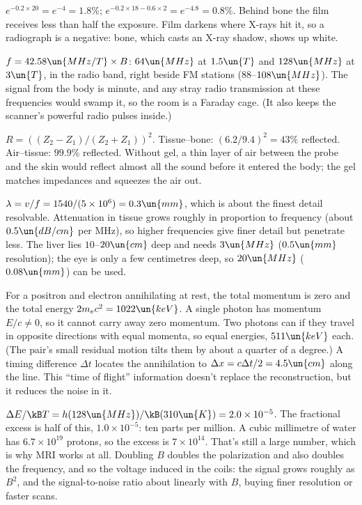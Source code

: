 
 $e^{-0.2\times20} = e^{-4} = 1.8\%$; $e^{-0.2\times18 - 0.6\times2} = e^{-4.8} = 0.8\%$. Behind bone the film receives less than half the exposure. Film darkens where X-rays hit it, so a radiograph is a negative: bone, which casts an X-ray shadow, shows up white.

 $f = 42.58\un{MHz/T}\times B$: $64\un{MHz}$ at $1.5\un{T}$ and $128\un{MHz}$ at $3\un{T}$, in the radio band, right beside FM stations ($88$--$108\un{MHz}$). The signal from the body is minute, and any stray radio transmission at these frequencies would swamp it, so the room is a Faraday cage. (It also keeps the scanner's powerful radio pulses inside.)

 $R = ((Z_2-Z_1)/(Z_2+Z_1))^2$. Tissue--bone: $(6.2/9.4)^2 = 43\%$ reflected. Air--tissue: $99.9\%$ reflected. Without gel, a thin layer of air between the probe and the skin would reflect almost all the sound before it entered the body; the gel matches impedances and squeezes the air out.

 $\lambda = v/f = 1540/(5\times10^6) = 0.3\un{mm}$, which is about the finest detail resolvable. Attenuation in tissue grows roughly in proportion to frequency (about $0.5\un{dB/cm}$ per MHz), so higher frequencies give finer detail but penetrate less. The liver lies $10$--$20\un{cm}$ deep and needs $3\un{MHz}$ ($0.5\un{mm}$ resolution); the eye is only a few centimetres deep, so $20\un{MHz}$ ($0.08\un{mm}$) can be used.

 For a positron and electron annihilating at rest, the total momentum is zero and the total energy $2m_ec^2 = 1022\un{keV}$. A single photon has momentum $E/c\neq0$, so it cannot carry away zero momentum. Two photons can if they travel in opposite directions with equal momenta, so equal energies, $511\un{keV}$ each. (The pair's small residual motion tilts them by about a quarter of a degree.) A timing difference $\Delta t$ locates the annihilation to $\Delta x = c\Delta t/2 = 4.5\un{cm}$ along the line. This ``time of flight'' information doesn't replace the reconstruction, but it reduces the noise in it.

 $\Delta E/\kB T = h(128\un{MHz})/\kB(310\un{K}) = 2.0\times10^{-5}$. The fractional excess is half of this, $1.0\times10^{-5}$: ten parts per million. A cubic millimetre of water has $6.7\times10^{19}$ protons, so the excess is $7\times10^{14}$. That's still a large number, which is why MRI works at all. Doubling $B$ doubles the polarization and also doubles the frequency, and so the voltage induced in the coils: the signal grows roughly as $B^2$, and the signal-to-noise ratio about linearly with $B$, buying finer resolution or faster scans.

